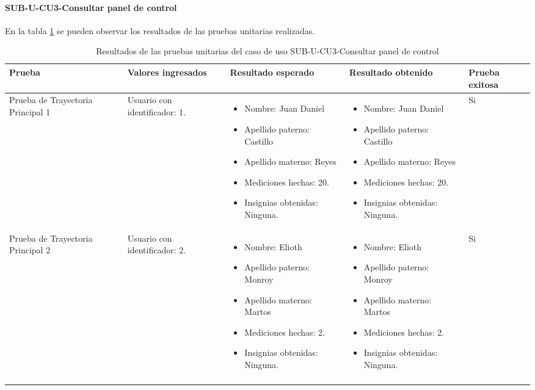 \paragraph{SUB-U-CU3-Consultar panel de control}\label{SUB-U-CU3:Pruebas}
En la tabla \ref{pruebas_unitarias_sub-u-cu3} se pueden observar los resultados de las pruebas unitarias realizadas.
\begin{longtable}{|M{2cm}| M{4.5cm}|M{3cm}|M{3cm}|M{1.5cm}|}
	\hline
	\textbf{Prueba} & \textbf{Valores ingresados} & \textbf{Resultado esperado} & \textbf{Resultado obtenido} & \textbf{Prueba exitosa} \\ \hline
	Prueba de Trayectoria Principal 1 & Usuario con identificador: 1.
	& 
	\begin{itemize}
		\item Nombre: Juan Daniel
		\item Apellido paterno: Castillo
		\item Apellido materno: Reyes
		\item Mediciones hechas: 20.
		\item Insignias obtenidas: Ninguna.
	\end{itemize}
	&
	\begin{itemize}
		\item Nombre: Juan Daniel
		\item Apellido paterno: Castillo
		\item Apellido materno: Reyes
		\item Mediciones hechas: 20.
		\item Insignias obtenidas: Ninguna.
	\end{itemize}
	& Si \\ \hline

	Prueba de Trayectoria Principal 2 & Usuario con identificador: 2.
	&
	\begin{itemize}
		\item Nombre: Elioth
		\item Apellido paterno: Monroy
		\item Apellido materno: Martos
		\item Mediciones hechas: 2.
		\item Insignias obtenidas: Ninguna.
	\end{itemize}
	& 
	\begin{itemize}
		\item Nombre: Elioth
		\item Apellido paterno: Monroy
		\item Apellido materno: Martos
		\item Mediciones hechas: 2.
		\item Insignias obtenidas: Ninguna.
	\end{itemize}
	& Si \\ \hline

	\caption{Resultados de las pruebas unitarias del caso de uso SUB-U-CU3-Consultar panel de control}
	\label{pruebas_unitarias_sub-u-cu3}
\end{longtable}
